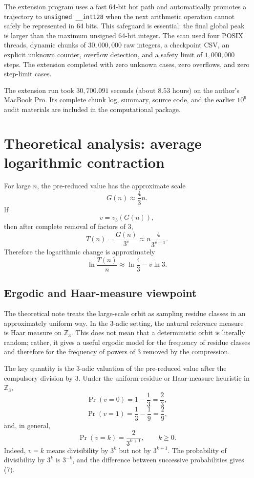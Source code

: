 \documentclass[11pt]{article}
\begin{document}
The extension program uses a fast 64-bit hot path and automatically promotes a trajectory to \texttt{unsigned \_\_int128} when the next arithmetic operation cannot safely be represented in 64 bits. This safeguard is essential: the final global peak is larger than the maximum unsigned 64-bit integer. The scan used four POSIX threads, dynamic chunks of $30,000,000$ raw integers, a checkpoint CSV, an explicit unknown counter, overflow detection, and a safety limit of $1,000,000$ steps. The extension completed with zero unknown cases, zero overflows, and zero step-limit cases.

The extension run took $30,700.091$ seconds (about $8.53$ hours) on the author's MacBook Pro. Its complete chunk log, summary, source code, and the earlier $10^9$ audit materials are included in the computational package.

\section{Theoretical analysis: average logarithmic contraction}
For large $n$, the pre-reduced value has the approximate scale
\[
G(n)\approx\frac43n.
\]
If
\[
v=v_3(G(n)),
\]
then after complete removal of factors of $3$,
\[
T(n)=\frac{G(n)}{3^v}
\approx n\frac{4}{3^{v+1}}.
\tag{5}
\]
Therefore the logarithmic change is approximately
\[
\ln\frac{T(n)}n
\approx \ln\frac43-v\ln3.
\tag{6}
\]

\subsection{Ergodic and Haar-measure viewpoint}
The theoretical note treats the large-scale orbit as sampling residue classes in an approximately uniform way. In the $3$-adic setting, the natural reference measure is Haar measure on $\mathbb Z_3$. This does not mean that a deterministic orbit is literally random; rather, it gives a useful ergodic model for the frequency of residue classes and therefore for the frequency of powers of $3$ removed by the compression.

The key quantity is the $3$-adic valuation of the pre-reduced value after the compulsory division by $3$. Under the uniform-residue or Haar-measure heuristic in $\mathbb Z_3$,
\[
\Pr(v=0)=1-\frac13=\frac23,
\]
\[
\Pr(v=1)=\frac13-\frac19=\frac29,
\]
and, in general,
\[
\Pr(v=k)=\frac{2}{3^{k+1}},
\qquad k\ge0.
\tag{7}
\]
Indeed, $v=k$ means divisibility by $3^k$ but not by $3^{k+1}$. The probability of divisibility by $3^k$ is $3^{-k}$, and the difference between successive probabilities gives (7).
\end{document}
